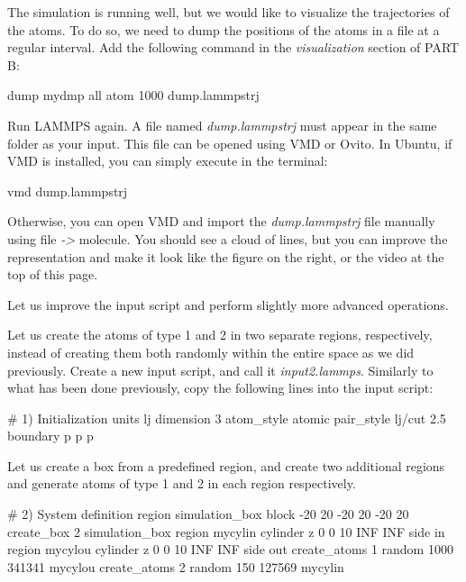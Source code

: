 The simulation is running well, but we would like to
visualize the trajectories of the atoms. To do so, we need
to dump the positions of the atoms in a file at a regular
interval. Add the following command in the \textit{visualization}
section of PART B:

\begin{lcverbatim}
dump mydmp all atom 1000 dump.lammpstrj
\end{lcverbatim}

\noindent Run LAMMPS again. A file named \textit{dump.lammpstrj} must appear in
the same folder as your input. This file can be opened using
VMD or Ovito. In Ubuntu, if VMD is installed, you can simply
execute in the terminal:

\begin{lcverbatim}
vmd dump.lammpstrj
\end{lcverbatim}

\noindent Otherwise, you can open VMD and import the \textit{dump.lammpstrj}
file manually using file \textit{->} molecule. You should see a cloud
of lines, but you can improve the representation and make it
look like the figure on the right, or the video at the 
top of this page. 

Let us improve the input script and perform slightly more
advanced operations.

Let us create the atoms of type 1 and 2 in two separate
regions, respectively, instead of creating them both randomly 
within the entire space as we did previously. Create a new input script, and call
it \textit{input2.lammps}. Similarly to what has been done previously, copy the following lines
into the input script:

\begin{lcverbatim}
# 1) Initialization
units lj
dimension 3
atom_style atomic
pair_style lj/cut 2.5
boundary p p p
\end{lcverbatim}

\noindent Let us create a box from a predefined region,
and create two additional regions and generate
atoms of type 1 and 2 in each region respectively.

\begin{lcverbatim}
# 2) System definition
region simulation_box block -20 20 -20 20 -20 20
create_box 2 simulation_box
region mycylin cylinder z 0 0 10 INF INF side in
region mycylou cylinder z 0 0 10 INF INF side out
create_atoms 1 random 1000 341341 mycylou
create_atoms 2 random 150 127569 mycylin
\end{lcverbatim}

